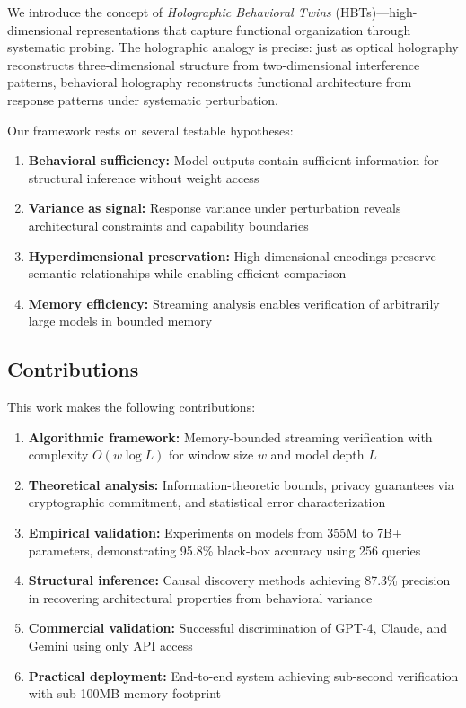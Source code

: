 \documentclass[11pt,a4paper]{article}
\begin{document}
We introduce the concept of \textit{Holographic Behavioral Twins} (HBTs)—high-dimensional representations that capture functional organization through systematic probing. The holographic analogy is precise: just as optical holography reconstructs three-dimensional structure from two-dimensional interference patterns, behavioral holography reconstructs functional architecture from response patterns under systematic perturbation.

Our framework rests on several testable hypotheses:

\begin{enumerate}
\item \textbf{Behavioral sufficiency:} Model outputs contain sufficient information for structural inference without weight access
\item \textbf{Variance as signal:} Response variance under perturbation reveals architectural constraints and capability boundaries
\item \textbf{Hyperdimensional preservation:} High-dimensional encodings preserve semantic relationships while enabling efficient comparison
\item \textbf{Memory efficiency:} Streaming analysis enables verification of arbitrarily large models in bounded memory
\end{enumerate}

\subsection{Contributions}

This work makes the following contributions:

\begin{enumerate}
\item \textbf{Algorithmic framework:} Memory-bounded streaming verification with complexity $O(w \log L)$ for window size $w$ and model depth $L$
\item \textbf{Theoretical analysis:} Information-theoretic bounds, privacy guarantees via cryptographic commitment, and statistical error characterization
\item \textbf{Empirical validation:} Experiments on models from 355M to 7B+ parameters, demonstrating 95.8\% black-box accuracy using 256 queries
\item \textbf{Structural inference:} Causal discovery methods achieving 87.3\% precision in recovering architectural properties from behavioral variance
\item \textbf{Commercial validation:} Successful discrimination of GPT-4, Claude, and Gemini using only API access
\item \textbf{Practical deployment:} End-to-end system achieving sub-second verification with sub-100MB memory footprint
\end{enumerate}
\end{document}
